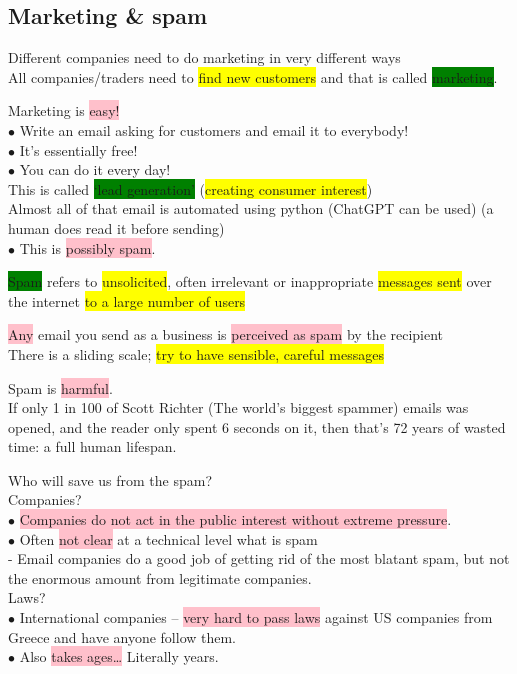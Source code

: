 \documentclass[tikz,border=10pt]{project_plan}
\newcommand{\bulletPoint}{\hspace{-3.1pt}$\bullet$ \hspace{5pt}}
\begin{document}
\subsection{Marketing \& spam}

Different companies need to do marketing in very different ways\\
All companies/traders need to \colorbox{yellow}{find new customers} and that is called \colorbox{green}{marketing}.

Marketing is \colorbox{pink}{easy!}\\
\bulletPoint Write an email asking for customers and email it to everybody! \\
\bulletPoint It’s essentially free!\\
\bulletPoint You can do it every day!\\
This is called \colorbox{green}{‘lead generation’} (\colorbox{yellow}{creating consumer interest})\\
Almost all of that email is automated using python (ChatGPT can be used) (a human does read it before sending)\\
\bulletPoint This is \colorbox{pink}{possibly spam}.

\colorbox{green}{Spam} refers to \colorbox{yellow}{unsolicited}, often irrelevant or inappropriate \colorbox{yellow}{messages sent}
over the internet \colorbox{yellow}{to a large number of users}

\colorbox{pink}{Any} email you send as a business is \colorbox{pink}{perceived as spam} by the recipient \\
There is a sliding scale; \colorbox{yellow}{try to have sensible, careful messages}

Spam is \colorbox{pink}{harmful}. \\
If only 1 in 100 of Scott Richter (The world's biggest spammer) emails was opened, and the reader only
spent 6 seconds on it, then that’s 72 years of wasted time: a full human lifespan.

Who will save us from the spam? \\
Companies? \\
\bulletPoint \colorbox{pink}{Companies do not act in the public interest without extreme pressure}. \\
\bulletPoint Often \colorbox{pink}{not clear} at a technical level what is spam\\
- Email companies do a good job of getting rid of the most blatant spam, but not
the enormous amount from legitimate companies.\\
Laws? \\
\bulletPoint International companies – \colorbox{pink}{very hard to pass laws} against US
companies from Greece and have anyone follow them. \\
\bulletPoint Also \colorbox{pink}{takes ages…} Literally years.
\end{document}
